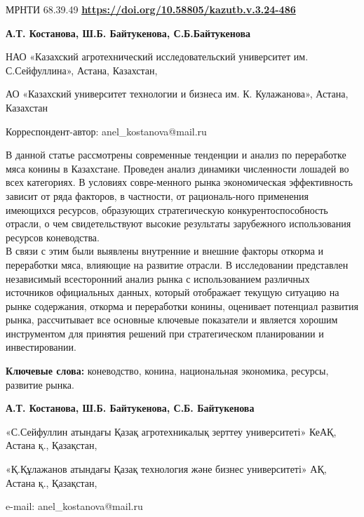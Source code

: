 \newpage
МРНТИ 68.39.49
\hfill {\bfseries \href{https://doi.org/10.58805/kazutb.v.3.24-486}{https://doi.org/10.58805/kazutb.v.3.24-486}}


\begin{center}

{\bfseries А.Т. Костанова\envelope, Ш.Б. Байтукенова, С.Б.Байтукенова}

НАО «Казахский агротехнический исследовательский университет им.
С.Сейфуллина», Астана, Казахстан,

АО «Казахский университет технологии и бизнеса им. К. Кулажанова», Астана, Казахстан
\end{center}

\envelope Корреспондент-автор: anel\_kostanova@mail.ru\vspace{0.5cm}

В данной статье рассмотрены современные тенденции и анализ по
переработке мяса конины в Казахстане. Проведен анализ динамики
численности лошадей во всех категориях. В условиях совре-менного рынка
экономическая эффективность зависит от ряда факторов, в частности, от
рациональ-ного применения имеющихся ресурсов, образующих стратегическую
конкурентоспособность отрасли, о чем свидетельствуют высокие результаты
зарубежного использования ресурсов коневодства. \\В связи с этим были
выявлены внутренние и внешние факторы откорма и переработки мяса,
влияющие на развитие отрасли. В исследовании представлен независимый
всесторонний анализ рынка с использованием различных источников
официальных данных, который отображает текущую ситуацию на рынке
содержания, откорма и переработки конины, оценивает потенциал развития
рынка, рассчитывает все основные ключевые показатели и является хорошим
инструментом для принятия решений при стратегическом планировании и
инвестировании.

{\bfseries Ключевые слова:} коневодство, конина, национальная экономика, ресурсы,
развитие рынка.

\begin{center}

{\bfseries А.Т. Костанова\envelope, Ш.Б. Байтукенова, С.Б.
Байтукенова}

«С.Сейфуллин атындағы Қазақ агротехникалық зерттеу университеті» КеАҚ, Астана қ., Қазақстан,

«Қ.Құлажанов атындағы Қазақ технология және бизнес университеті» АҚ, Астана қ., Қазақстан,

e-mail: anel\_kostanova@mail.ru
\end{center}

